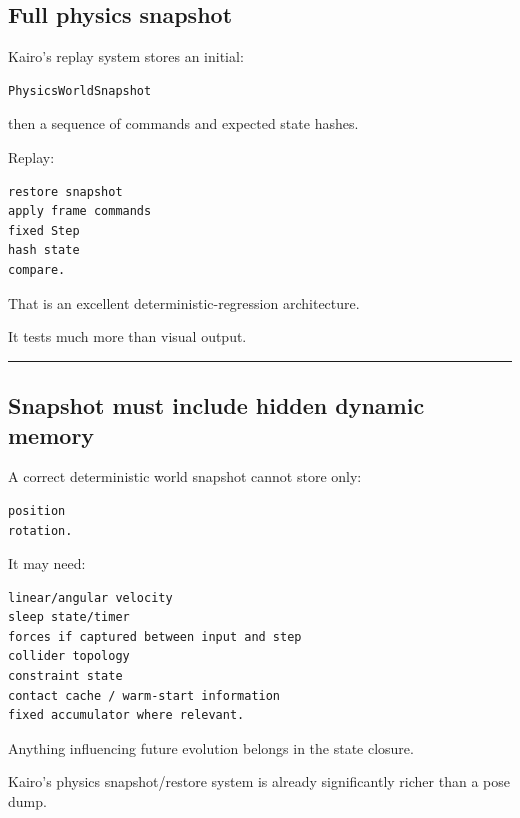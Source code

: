 \subsection{Full physics snapshot}\label{06-engine-ii-ch037-full-physics-snapshot}

\hypertarget{06-engine-ii-ch037-full-physics-snapshot}{}

Kairo's replay system stores an initial:

\begin{verbatim}
PhysicsWorldSnapshot
\end{verbatim}

then a sequence of commands and expected state hashes.

Replay:

\begin{verbatim}
restore snapshot
apply frame commands
fixed Step
hash state
compare.
\end{verbatim}

That is an excellent deterministic-regression architecture.

It tests much more than visual output.

\begin{center}\rule{0.5\linewidth}{0.5pt}\end{center}

\subsection{Snapshot must include hidden dynamic memory}\label{06-engine-ii-ch037-snapshot-must-include-hidden-dynamic-memory}

\hypertarget{06-engine-ii-ch037-snapshot-must-include-hidden-dynamic-memory}{}

A correct deterministic world snapshot cannot store only:

\begin{verbatim}
position
rotation.
\end{verbatim}

It may need:

\begin{verbatim}
linear/angular velocity
sleep state/timer
forces if captured between input and step
collider topology
constraint state
contact cache / warm-start information
fixed accumulator where relevant.
\end{verbatim}

Anything influencing future evolution belongs in the state closure.

Kairo's physics snapshot/restore system is already significantly richer than a pose dump.

